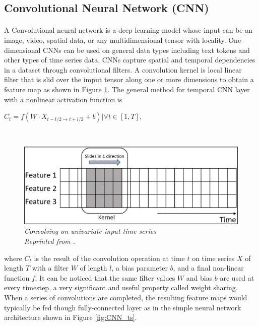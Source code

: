 \subsection{Convolutional Neural Network (CNN)}
\paragraph{}
A Convolutional neural network is a deep learning model whose input can be an image, video, spatial data, or any multidimensional tensor with locality. One-dimensional CNNs can be used on general data types including text tokens and other types of time series data. CNNs capture spatial and temporal dependencies in a dataset through convolutional filters. A convolution kernel is local linear filter that is slid over the imput tensor along one or more dimensions to obtain a feature map as shown in Figure \ref{fig:CNN}. The general method for temporal CNN layer with a nonlinear activation function is

\hfil $C_t = f(W \cdot X_{t-l/2 \to t+l/2} + b) | \forall t \in [1, T], $ \par \

\begin{figure}[H]
  \centering
  \caption[Convolving on univariate input time series]{\emph{Convolving on univariate input time series \\
  Reprinted from \citeauthor{ismail_fawaz_forestier_weber_idoumghar_muller_2019} \citeyear{ismail_fawaz_forestier_weber_idoumghar_muller_2019}.}}\label{fig:CNN}
  \includegraphics[scale = 0.3]{figures/CNN.jpg}  
\end{figure}


where $C_t$ is the result of the convolution operation at time $t$ on time series $X$ of length $T$ with a filter $W$ of length $l$, a bias parameter $b$, and a final non-linear function $f$. It can be noticed that the same filter values $W$ and bias $b$ are used at every timestep, a very significant and useful property called weight sharing. When a series of convolutions are completed, the resulting feature maps would typically be fed though fully-connected layer as in the simple neural network architecture shown in Figure \ref{fig:CNN_ts}.

